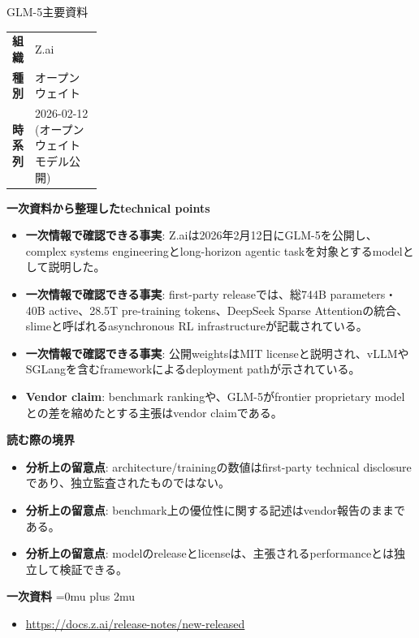 \begin{technicalnote}{GLM-5}{主要資料}
\begingroup
\begin{tabularx}{\linewidth}{@{}>{\bfseries}p{0.22\linewidth}X@{}}
組織 & Z.ai \\
種別 & オープンウェイト \\
時系列 & 2026-02-12 (オープンウェイトモデル公開) \\
\end{tabularx}
\smallskip
{\bfseries 一次資料から整理したtechnical points}
\begin{itemize}[leftmargin=1.5em,itemsep=0.35em]
\item \textbf{一次情報で確認できる事実}: Z.aiは2026年2月12日にGLM-5を公開し、complex systems engineeringとlong-horizon agentic taskを対象とするmodelとして説明した。
\item \textbf{一次情報で確認できる事実}: first-party releaseでは、総744B parameters・40B active、28.5T pre-training tokens、DeepSeek Sparse Attentionの統合、slimeと呼ばれるasynchronous RL infrastructureが記載されている。
\item \textbf{一次情報で確認できる事実}: 公開weightsはMIT licenseと説明され、vLLMやSGLangを含むframeworkによるdeployment pathが示されている。
\item \textbf{Vendor claim}: benchmark rankingや、GLM-5がfrontier proprietary modelとの差を縮めたとする主張はvendor claimである。
\end{itemize}
\begin{minipage}{\linewidth}
{\bfseries 読む際の境界}
\begin{itemize}[leftmargin=1.5em,itemsep=0.35em]
\item \textbf{分析上の留意点}: architecture/trainingの数値はfirst-party technical disclosureであり、独立監査されたものではない。
\item \textbf{分析上の留意点}: benchmark上の優位性に関する記述はvendor報告のままである。
\item \textbf{分析上の留意点}: modelのreleaseとlicenseは、主張されるperformanceとは独立して検証できる。
\end{itemize}
\begin{samepage}
{\bfseries 一次資料}
\begingroup\sloppy
\Urlmuskip=0mu plus 2mu\relax
\begin{itemize}[leftmargin=1.5em,itemsep=0.25em]
\item {\scriptsize\url{https://docs.z.ai/release-notes/new-released}}
\end{itemize}
\endgroup
\end{samepage}
\end{minipage}
\endgroup
\end{technicalnote}
\medskip

